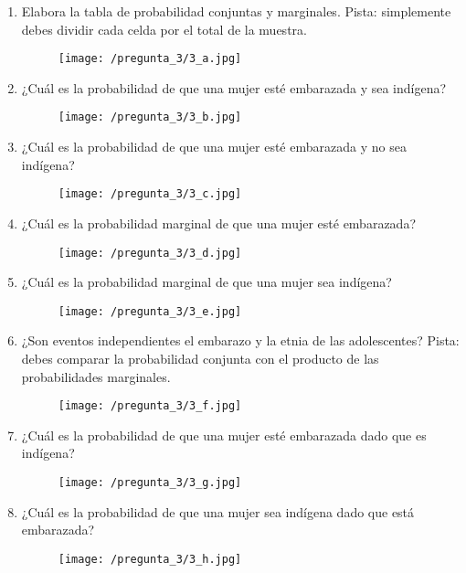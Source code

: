 \documentclass[a4paper]{article}
\begin{document}
\begin{enumerate}[label=\alph*.]
	\item Elabora la tabla de probabilidad conjuntas y marginales. Pista: simplemente debes dividir cada celda por el total de la muestra.
	\begin{figure}[H]
		\texttt{[image: /pregunta\_3/3\_a.jpg]}
	\end{figure}
	\newpage
	\item ¿Cuál es la probabilidad de que una mujer esté embarazada y sea indígena?
	\begin{figure}[H]
		\texttt{[image: /pregunta\_3/3\_b.jpg]}
	\end{figure}
	\item ¿Cuál es la probabilidad de que una mujer esté embarazada y no sea indígena?
	\begin{figure}[H]
		\texttt{[image: /pregunta\_3/3\_c.jpg]}
	\end{figure}
	\item ¿Cuál es la probabilidad marginal de que una mujer esté embarazada?
	\begin{figure}[H]
		\texttt{[image: /pregunta\_3/3\_d.jpg]}
	\end{figure}
	\item ¿Cuál es la probabilidad marginal de que una mujer sea indígena?
	\begin{figure}[H]
		\texttt{[image: /pregunta\_3/3\_e.jpg]}
	\end{figure}
	\item ¿Son eventos independientes el embarazo y la etnia de las adolescentes? Pista: debes comparar la probabilidad conjunta con el producto de las probabilidades marginales.
	\begin{figure}[H]
		\texttt{[image: /pregunta\_3/3\_f.jpg]}
	\end{figure}
	\newpage
	\item ¿Cuál es la probabilidad de que una mujer esté embarazada dado que es indígena?
	\begin{figure}[H]
		\texttt{[image: /pregunta\_3/3\_g.jpg]}
	\end{figure}
	\item ¿Cuál es la probabilidad de que una mujer sea indígena dado que está embarazada?
	\begin{figure}[H]
		\texttt{[image: /pregunta\_3/3\_h.jpg]}
	\end{figure}
\end{enumerate}
\end{document}
